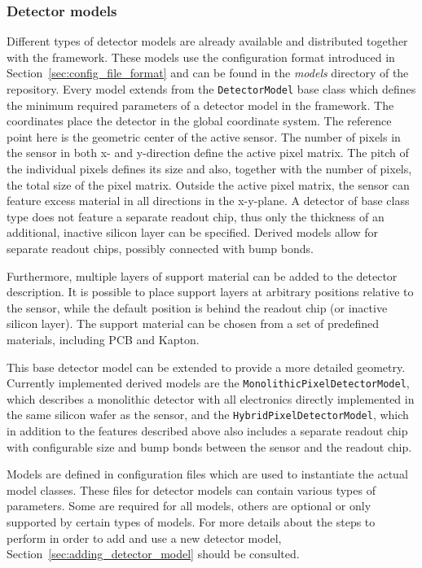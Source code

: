 \subsubsection{Detector models}
\label{sec:detector_models}
Different types of detector models are already available and distributed together with the framework.
These models use the configuration format introduced in Section~\ref{sec:config_file_format} and can be found in the \textit{models} directory of the repository.
Every model extends from the \texttt{DetectorModel} base class which defines the minimum required parameters of a detector model in the framework.
The coordinates place the detector in the global coordinate system. The reference point here is the geometric center of the active sensor.
The number of pixels in the sensor in both x- and y-direction define the active pixel matrix.
The pitch of the individual pixels defines its size and also, together with the number of pixels, the total size of the pixel matrix.
Outside the active pixel matrix, the sensor can feature excess material in all directions in the x-y-plane.
A detector of base class type does not feature a separate readout chip, thus only the thickness of an additional, inactive silicon layer can be specified.
Derived models allow for separate readout chips, possibly connected with bump bonds.

Furthermore, multiple layers of support material can be added to the detector description.
It is possible to place support layers at arbitrary positions relative to the sensor, while the default position is behind the readout chip (or inactive silicon layer).
The support material can be chosen from a set of predefined materials, including PCB and Kapton.

This base detector model can be extended to provide a more detailed geometry.
Currently implemented derived models are the \texttt{MonolithicPixelDetectorModel}, which describes a monolithic detector with all electronics directly implemented in the same silicon wafer as the sensor, and the \texttt{HybridPixelDetectorModel}, which in addition to the features described above also includes a separate readout chip with configurable size and bump bonds between the sensor and the readout chip.

Models are defined in configuration files which are used to instantiate the actual model classes.
These files for detector models can contain various types of parameters.
Some are required for all models, others are optional or only supported by certain types of models.
For more details about the steps to perform in order to add and use a new detector model, Section~\ref{sec:adding_detector_model} should be consulted.

